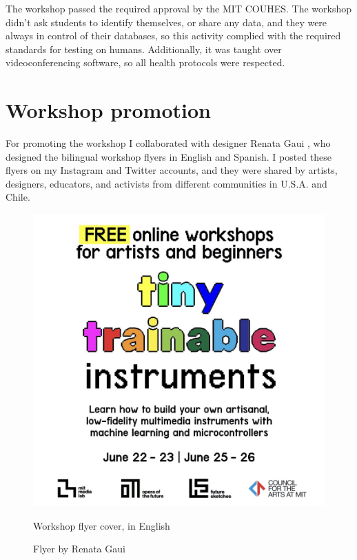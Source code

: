 The workshop passed the required approval by the \acrshort{MIT} \acrfull{COUHES}. The workshop didn't ask students to identify themselves, or share any data, and they were always in control of their databases, so this activity complied with the required standards for testing on humans. Additionally, it was taught over videoconferencing software, so all health protocols were respected.

\section{Workshop promotion}

For promoting the workshop I collaborated with designer Renata Gaui \cite{website-renata-gaui}, who designed the bilingual workshop flyers in English and Spanish. I posted these flyers on my Instagram and Twitter accounts, and they were shared by  artists, designers, educators, and activists from different communities in U.S.A. and Chile.

\begin{figure}[ht]
  \centering
  \includegraphics[width=0.75\linewidth,height=0.35\textheight,keepaspectratio]{images/workshop-en-1.jpg}
  \caption{Workshop flyer cover, in English}
  \caption*{Flyer by Renata Gaui}
  \label{fig:workshop-english-flyer-page-1}
\end{figure}


